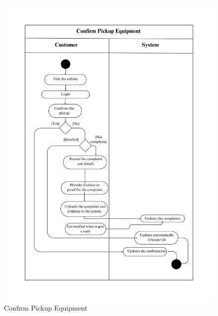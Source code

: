 \begin{figure}[h!]
    \centering
    \includegraphics[width=1\textwidth]{Images/Activity Diagrams/34 Confirm Pickup Equipment.png}
    \caption{Confirm Pickup Equipment}
    \label{fig:activity-confirm-pickup}
\end{figure}

